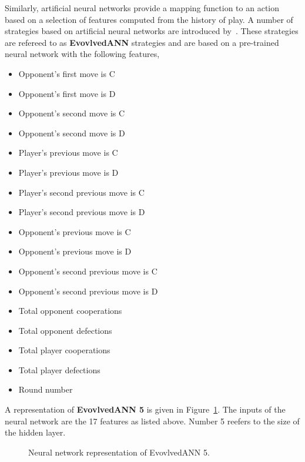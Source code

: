 \documentclass{article}
\begin{document}
Similarly, artificial neural networks provide a mapping function to an action
based on a selection of features computed from the history of play. A number 
of strategies based on artificial neural networks are introduced by~\cite{Knight2017}.
These strategies are refereed to as \textbf{EvovlvedANN} strategies and are
based on a pre-trained neural network with the following features,

\begin{multicols}{2}
    \begin{itemize}
        \item Opponent's first move is C
        \item Opponent's first move is D
        \item Opponent's second move is C
        \item Opponent's second move is D
        \item Player's previous move is C
        \item Player's previous move is D
        \item Player's second previous move is C
        \item Player's second previous move is D
        \item Opponent's previous move is C
        \item Opponent's previous move is D
        \item Opponent's second previous move is C
        \item Opponent's second previous move is D
        \item Total opponent cooperations
        \item Total opponent defections
        \item Total player cooperations
        \item Total player defections
        \item Round number
    \end{itemize}
\end{multicols}

A representation of \textbf{EvovlvedANN 5} is given in Figure~\ref{fig:ann_5_neural}. 
The inputs of the neural network are the 17 features as listed above. Number 5 
reefers to the size of the hidden layer.

\begin{figure}[!hbtp]
    \centering
    
    \caption{Neural network representation of EvovlvedANN 5.}
    \label{fig:ann_5_neural}
\end{figure}
\end{document}
